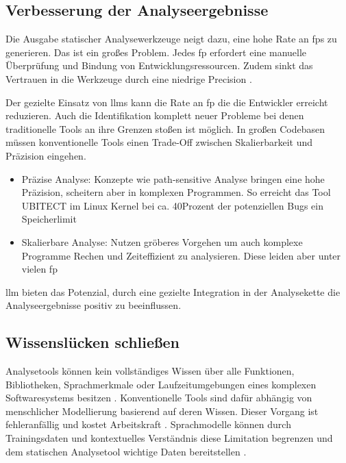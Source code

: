 \documentclass[%
    paper=A4,               %
    ngerman,
    parskip=half,           %
    11pt,                   %
    headings=normal,        %
    bibliography=totoc,     %
    listof=totoc,           %
    chapterprefix=false,    %
    appendixprefix=false,    %
    draft=false,            %
]{scrartcl}%
\begin{document}
\subsection{Verbesserung der Analyseergebnisse}

Die Ausgabe statischer Analysewerkzeuge neigt dazu, eine hohe Rate an \acfp{fp} zu generieren. Das ist ein großes Problem. Jedes \ac{fp} erfordert eine manuelle Überprüfung und Bindung von Entwicklungsressourcen. Zudem sinkt das Vertrauen in die Werkzeuge durch eine niedrige Precision \cite{wagnerEffectiveComplementarySecurity2025}.

Der gezielte Einsatz von \acp{llm} kann die Rate an \ac{fp} die die Entwickler erreicht reduzieren\cite{wagnerEffectiveComplementarySecurity2025}. Auch die Identifikation komplett neuer Probleme bei denen traditionelle Tools an ihre Grenzen stoßen ist möglich. In großen Codebasen müssen konventionelle Tools einen Trade-Off zwischen Skalierbarkeit und Präzision eingehen.

\begin{itemize}
    \item Präzise Analyse: Konzepte wie path-sensitive Analyse bringen eine hohe Präzision, scheitern aber in komplexen Programmen. So erreicht das Tool UBITECT im Linux Kernel bei ca. 40Prozent der potenziellen Bugs ein Speicherlimit \cite{liEnhancingStaticAnalysis2024}
\item Skalierbare Analyse: Nutzen gröberes Vorgehen um auch komplexe Programme Rechen und Zeiteffizient zu analysieren. Diese leiden aber unter vielen \ac{fp} 
\end{itemize} 

\ac{llm} bieten das Potenzial, durch eine gezielte Integration in der Analysekette die Analyseergebnisse positiv zu beeinflussen\cite{chapmanInterleavingStaticAnalysis2024}.

\subsection{Wissenslücken schließen}

Analysetools können kein vollständiges Wissen über alle Funktionen, Bibliotheken, Sprachmerkmale oder Laufzeitumgebungen eines komplexen Softwaresystems besitzen \cite{liEnhancingStaticAnalysis2024}. Konventionelle Tools sind dafür abhängig von menschlicher Modellierung basierend auf deren Wissen. Dieser Vorgang ist fehleranfällig und kostet Arbeitskraft \cite{liIRISLLMAssistedStatic2024}. Sprachmodelle können durch Trainingsdaten und kontextuelles Verständnis diese Limitation begrenzen und dem statischen Analysetool wichtige Daten bereitstellen \cite{liEnhancingStaticAnalysis2024}. 
\end{document}
